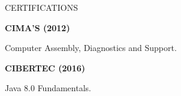 \documentclass{resume} %
\begin{document}
    \begin{rSection}{CERTIFICATIONS}
        \vspace{-1.25em}
        \item \textbf{CIMA'S (2012)}
        \item {Computer Assembly, Diagnostics and Support.}
        \item \textbf{CIBERTEC (2016)}
        \item {Java 8.0 Fundamentals.}
    \end{rSection}
\end{document}

